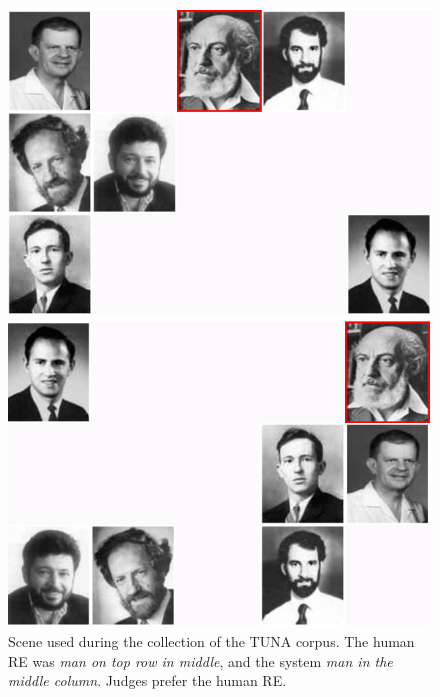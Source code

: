 

\begin{figure}[ht]
\begin{minipage}{0.50\linewidth}
\centering
\includegraphics[width=\textwidth]{images/s28t25.png}
\caption{Scene used during the collection of the TUNA corpus. The human  RE was \emph{man on top row in middle}, and the system \emph{man in the middle column}. Judges prefer the human RE.}
\label{s28t25}
\end{minipage}
\begin{minipage}{0.50\linewidth}
\centering
\includegraphics[width=\textwidth]{images/s120t26.png}

\end{minipage}
\end{figure}

